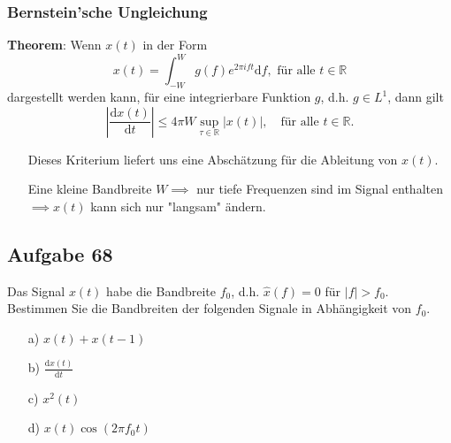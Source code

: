 \documentclass[11pt]{article}
\begin{document}
\vspace*{-0.5cm}
\subsubsection*{Bernstein'sche Ungleichung}
\vspace*{-0.5cm}
\textbf{Theorem}: Wenn $x(t)$ in der Form $$x(t) = \displaystyle\int_{-W}^W g(f)e^{2 \pi i f t} \text{d}f, \text{ für alle } t\in \mathbb{R}$$ dargestellt werden kann, für eine integrierbare Funktion $g$, d.h. $g\in L^1$, dann gilt $$\left| \frac{\text{d}x(t)}{\text{d}t} \right| \leq 4 \pi W \sup_{\tau \in \mathbb{R}}|x(t)|, \hspace{12pt} \text{für alle } t \in \mathbb{R}.$$

\begin{itemize}[leftmargin=0pt]
    \item[] Dieses Kriterium liefert uns eine Abschätzung für die Ableitung von $x(t)$.
    \item[] Eine kleine Bandbreite $W \implies$ nur tiefe Frequenzen sind im Signal enthalten $\implies x(t)$ kann sich nur "langsam" ändern.
\end{itemize}

\pagebreak

\subsection*{Aufgabe 68}
\vspace*{-0.5cm}
Das Signal $x(t)$ habe die Bandbreite $f_0$, d.h. $\hat{x}(f) = 0$ für $|f|>f_0$. Bestimmen Sie die Bandbreiten der folgenden Signale in Abhängigkeit von $f_0$.
\begin{multicols}{2}
    \begin{itemize}
        \item[a)] $x(t) + x(t-1)$
        \item[b)] $\displaystyle\frac{\text{d}x(t)}{\text{d}t}$
        \item[c)] $x^2(t)$
        \item[d)] $x(t)\cos(2 \pi f_0 t)$
    \end{itemize}
\end{multicols}

\end{document}
